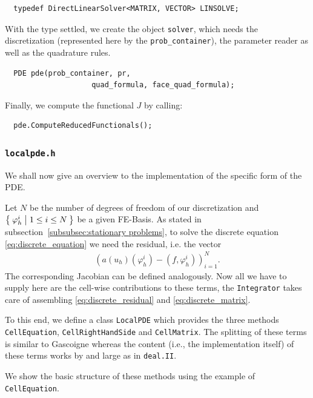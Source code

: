 \documentclass[smallextended]{svjour3}       %
\numberwithin{equation}{section}
\renewcommand{\phi}{\varphi}
\newcommand{\deal}{\texttt{deal.II}}
\begin{document}
\begin{lstlisting}
  typedef DirectLinearSolver<MATRIX, VECTOR> LINSOLVE;
\end{lstlisting}
With the type settled, we create the object \texttt{solver}, which needs the discretization (represented here by the \texttt{prob\_container}), the parameter reader as well as the quadrature rules.
\begin{lstlisting}
  PDE pde(prob_container, pr,
                    quad_formula, face_quad_formula);
\end{lstlisting}
Finally, we compute the functional $J$ by calling:
\begin{lstlisting}
  pde.ComputeReducedFunctionals();
\end{lstlisting}

\subsubsection{\texttt{localpde.h}}
We shall now give an overview to the implementation of the specific form of the PDE. 

Let $N$ be the number of degrees of freedom of our discretization and $\Set{\phi_{h}^{i}|1\leq i \leq N}$ be a given FE-Basis. As stated in subsection~\ref{subsubsec:stationary problems}, to solve the discrete equation \eqref{eq:discrete_equation} we need the residual, i.e. the vector
\begin{align}\label{eq:discrete_residual}
\left(a(u_h)(\phi_{h}^{i})-(f,\phi_{h}^{i})\right)_{i=1}^N.
\end{align}
The corresponding Jacobian can be defined analogously.
Now all we have to supply here are the cell-wise contributions to these terms, the \texttt{Integrator} takes care of assembling \eqref{eq:discrete_residual} and \eqref{eq:discrete_matrix}.

To this end, we define a class \texttt{LocalPDE} which provides the three methods
\texttt{CellEquation}, \texttt{CellRightHandSide} and \texttt{CellMatrix}. 
The splitting of these terms is similar to Gascoigne
\cite{gascoigne} whereas the content (i.e., the 
implementation itself) of these
terms works by and large as in \deal{}. 


We show the basic structure of these methods using the example of \texttt{CellEquation}.
\end{document}
